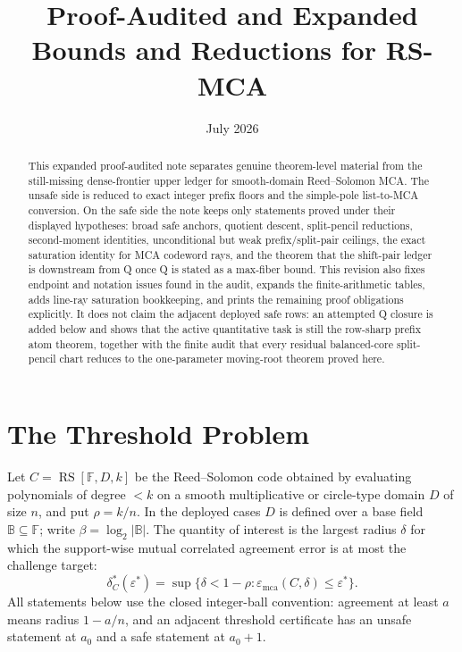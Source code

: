 \documentclass[a4paper,11pt]{amsart}
\title{Proof-Audited and Expanded Bounds and Reductions for RS-MCA}
\date{July 2026}
\theoremstyle{remark}
\newcommand{\F}{\mathbb F}
\newcommand{\B}{\mathbb B}
\newcommand{\RS}{\operatorname{RS}}
\newcommand{\emca}{\varepsilon_{\mathrm{mca}}}
\begin{document}
\begin{abstract}
This expanded proof-audited note separates genuine theorem-level material from the still-missing dense-frontier upper ledger for smooth-domain Reed--Solomon MCA.  The unsafe side is reduced to exact integer prefix floors and the simple-pole list-to-MCA conversion.  On the safe side the note keeps only statements proved under their displayed hypotheses: broad safe anchors, quotient descent, split-pencil reductions, second-moment identities, unconditional but weak prefix/split-pair ceilings, the exact saturation identity for MCA codeword rays, and the theorem that the shift-pair ledger is downstream from Q once Q is stated as a max-fiber bound.  This revision also fixes endpoint and notation issues found in the audit, expands the finite-arithmetic tables, adds line-ray saturation bookkeeping, and prints the remaining proof obligations explicitly.  It does not claim the adjacent deployed safe rows: an attempted Q closure is added below and shows that the active quantitative task is still the row-sharp prefix atom theorem, together with the finite audit that every residual balanced-core split-pencil chart reduces to the one-parameter moving-root theorem proved here.
\end{abstract}

\maketitle




\section{The Threshold Problem}

Let \(C=\RS[\F,D,k]\) be the Reed--Solomon code obtained by evaluating polynomials of degree \(<k\) on a smooth multiplicative or circle-type domain \(D\) of size \(n\), and put \(\rho=k/n\).  In the deployed cases \(D\) is defined over a base field \(\B\subseteq\F\); write \(\beta=\log_2|\B|\).  The quantity of interest is the largest radius \(\delta\) for which the support-wise mutual correlated agreement error is at most the challenge target:
\[
        \delta_C^*(\varepsilon^*)=\sup\{\delta<1-\rho:\emca(C,\delta)\le\varepsilon^*\}.
\]
All statements below use the closed integer-ball convention: agreement at least \(a\) means radius \(1-a/n\), and an adjacent threshold certificate has an unsafe statement at \(a_0\) and a safe statement at \(a_0+1\).
\end{document}
